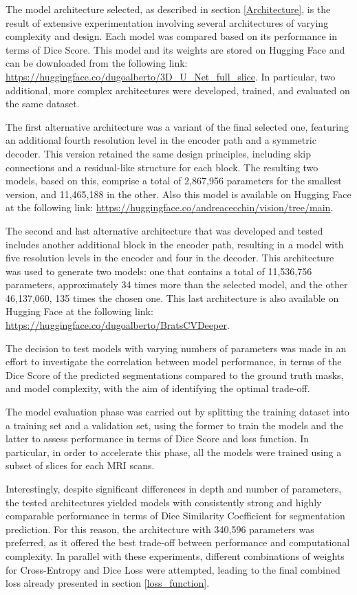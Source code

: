 \documentclass[10pt,twocolumn,letterpaper]{article}
\begin{document}
The model architecture selected, as described in section \ref{Architecture}, is the result of extensive experimentation involving several architectures of varying complexity and design. Each model was compared based on its performance in terms of Dice Score. This model and its weights are stored on Hugging Face and can be downloaded from the following link: \url{https://huggingface.co/dugoalberto/3D_U_Net_full_slice}.
In particular, two additional, more complex architectures were developed, trained, and evaluated on the same dataset.

The first alternative architecture was a variant of the final selected one, featuring an additional fourth resolution level in the encoder path and a symmetric decoder. This version retained the same design principles, including skip connections and a residual-like structure for each block. The resulting two models, based on this, comprise a total of 2,867,956 parameters for the smallest version, and 11,465,188 in the other. Also this model is available on Hugging Face at the following link: \url{https://huggingface.co/andreacecchin/vision/tree/main}.

The second and last alternative architecture that was developed and tested includes another additional block in the encoder path, resulting in a model with five resolution levels in the encoder and four in the decoder. This architecture was used to generate two models: one that contains a total of 11,536,756 parameters, approximately 34 times more than the selected model, and the other 46,137,060, 135 times the chosen one. This last architecture is also available on Hugging Face at the following link: \url{https://huggingface.co/dugoalberto/BratsCVDeeper}.

The decision to test models with varying numbers of parameters was made in an effort to investigate the correlation between model performance, in terms of the Dice Score of the predicted segmentations compared to the ground truth masks, and model complexity, with the aim of identifying the optimal trade-off.

The model evaluation phase was carried out by splitting the training dataset into a training set and a validation set, using the former to train the models and the latter to assess performance in terms of Dice Score and loss function. In particular, in order to accelerate this phase, all the models were trained using a subset of slices for each MRI scans.

Interestingly, despite significant differences in depth and number of parameters, the tested architectures yielded models with consistently strong and highly comparable performance in terms of  Dice Similarity Coefficient for segmentation prediction.
For this reason, the architecture with 340,596 parameters was preferred, as it offered the best trade-off between performance and computational complexity. In parallel with these experiments, different combinations of weights for Cross-Entropy and Dice Loss were attempted, leading to the final combined loss already presented in section \ref{loss_function}.
\end{document}

